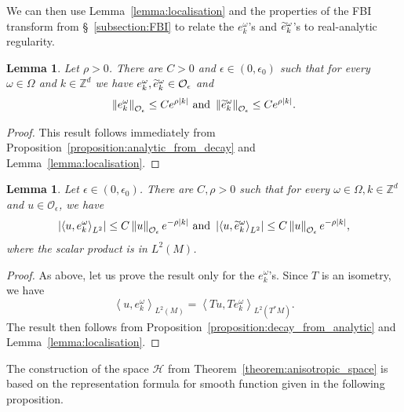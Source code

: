 \documentclass[10pt]{amsart}
\newtheorem{lemm}[theo]{Lemma}\newtheorem{prop}[theo]{Proposition}\newtheorem{coro}[theo]{Corollary}\newtheorem{conj}[theo]{Conjecture}
\theoremstyle{definition}\newtheorem{defi}[theo]{Definition}\newtheorem{rema}[theo]{Remark}\newtheorem{exam}[theo]{Example}\newtheorem{exem}[theo]{Example}\newtheorem{nota}[theo]{Notation}
\newcommand{\n}[1]{\left\|#1\right\|}
\newcommand{\va}[1]{\left|#1\right|}
\newcommand{\clO}{\mathcal{O}}
\newcommand{\clH}{\mathcal{H}}
\newcommand{\bbZ}{\mathbb{Z}}
\let\oldtilde\tilde
\renewcommand*{\tilde}[1]{\mathchoice{\widetilde{#1}}{\widetilde{#1}}{\oldtilde{#1}}{\oldtilde{#1}}}
\begin{document}
We can then use Lemma~\ref{lemma:localisation} and the properties of the FBI transform from \S~\ref{subsection:FBI} to relate the $e_k^\omega$'s and $\tilde{e}_k^\omega$'s to real-analytic regularity.

\begin{lemm}\label{lemma:ekomega_analytic}
Let $\rho > 0$. There are $C > 0$ and $\epsilon \in (0,\epsilon_0)$ such that for every $\omega \in \Omega$ and $k \in \bbZ^d$ we have $e_k^\omega, \tilde{e}_k^\omega \in \clO_\epsilon$ and
\begin{equation*}
\n{e_k^\omega}_{\clO_\epsilon} \leq C e^{\rho \va{k}} \text{ and } \n{\tilde{e}_k^\omega}_{\clO_\epsilon} \leq C e^{\rho \va{k}}.
\end{equation*}
\end{lemm}

\begin{proof}
This result follows immediately from Proposition~\ref{proposition:analytic_from_decay} and Lemma~\ref{lemma:localisation}.
\end{proof}

\begin{lemm}\label{lemma:dual_ekomega}
Let $\epsilon \in(0,\epsilon_0)$. There are $C,\rho > 0$ such that for every $\omega \in \Omega, k \in \bbZ^d$ and $u \in \clO_\epsilon$, we have
\begin{equation*}
\va{\left\langle u, e_k^\omega\right\rangle_{L^2}} \leq C \n{u}_{\clO_\epsilon}e^{- \rho \va{k}} \text{ and } \va{\left\langle u, \tilde{e}_k^\omega\right\rangle_{L^2}} \leq C \n{u}_{\clO_\epsilon} e^{- \rho \va{k}},
\end{equation*}
where the scalar product is in $L^2(M)$.
\end{lemm}

\begin{proof}
As above, let us prove the result only for the $e_k^\omega$'s. Since $T$ is an isometry, we have
\begin{equation}\label{eq:ex_isometry}
\left\langle u, e_k^\omega \right\rangle_{L^2(M)} = \left\langle T u, T e_k^\omega \right\rangle_{L^2(T^* M)}.
\end{equation}
The result then follows from Proposition~\ref{proposition:decay_from_analytic} and Lemma~\ref{lemma:localisation}.
\end{proof}

The construction of the space $\clH$ from Theorem~\ref{theorem:anisotropic_space} is based on the representation formula for smooth function given in the following proposition.
\end{document}
